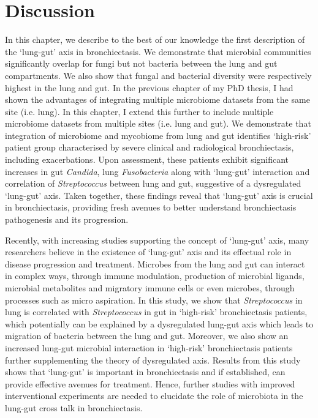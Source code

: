 \section{Discussion}

In this chapter, we describe to the best of our knowledge the first description of the `lung-gut' axis in bronchiectasis.
We demonstrate that microbial communities significantly overlap for fungi but not bacteria between the lung and gut compartments. We also show that fungal and bacterial diversity were respectively highest in the lung and gut. In the previous chapter of my PhD thesis, I had shown the advantages of integrating multiple microbiome datasets from the same site (i.e. lung). In this chapter, I extend this further to include multiple microbiome datasets from multiple sites (i.e. lung and gut). We demonstrate that integration of microbiome and mycobiome from lung and gut identifies `high-risk' patient group characterised by severe clinical and radiological bronchiectasis, including exacerbations. Upon assessment, these patients exhibit significant increases in gut \textit{Candida}, lung \textit{Fusobacteria} along with `lung-gut' interaction  and correlation of \textit{Streptococcus} between lung and gut, suggestive of a dysregulated `lung-gut' axis. Taken together, these findings reveal that `lung-gut' axis is crucial in bronchiectasis, providing fresh avenues to better understand bronchiectasis pathogenesis and its progression. 

Recently, with increasing studies supporting the concept of `lung-gut' axis, many researchers believe in the existence of `lung-gut' axis and its effectual role in disease progression and treatment. Microbes from the lung and gut can interact in complex ways, through immune modulation, production of microbial ligands, microbial metabolites and migratory immune cells or even microbes, through processes such as micro aspiration. In this study, we show that \textit{Streptococcus} in lung is correlated with \textit{Streptococcus} in gut in `high-risk' bronchiectasis patients, which potentially can be explained by a dysregulated lung-gut axis which leads to migration of bacteria between the lung and gut. Moreover, we also show an increased lung-gut microbial interaction in `high-risk' bronchiectasis patients further supplementing the theory of dysregulated axis. Results from this study shows that `lung-gut' is important in bronchiectasis and if established, can provide effective avenues for treatment. Hence, further studies with improved interventional experiments are needed to elucidate the role of microbiota in the lung-gut cross talk in bronchiectasis.  

